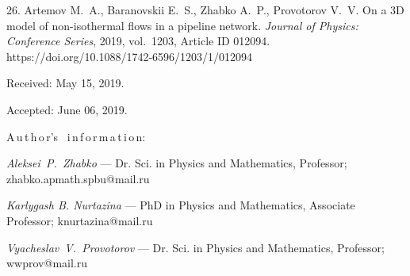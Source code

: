 {26. Artemov M.~A.,  Baranovskii E.~S.,  Zhabko A.~P.,  Provotorov
V.~V. On a 3D model of non-isothermal flows in a pipeline network.
\emph{Journal of Physics: Conference Series}, 2019, vol.~1203,
Article ID 012094. https://doi.org/10.1088/1742-6596/1203/1/012094


\vskip 1.5mm

%


Received:  May 15, 2019.

Accepted: June 06, 2019.

\vskip6mm A\,u\,t\,h\,o\,r's \ i\,n\,f\,o\,r\,m\,a\,t\,i\,o\,n:

\vskip2mm\textit{Aleksei~P.~Zhabko} --- Dr. Sci. in Physics and
Mathematics, Professor; zhabko.apmath.spbu@mail.ru

\vskip2mm\textit{Karlygash B. Nurtazina} ---  PhD in  Physics and
Mathematics, Associate Professor; knurtazina@mail.ru

\vskip2mm\textit{Vyacheslav~V.~Provotorov} --- Dr. Sci. in Physics
and Mathematics, Professor; wwprov@mail.ru

}

